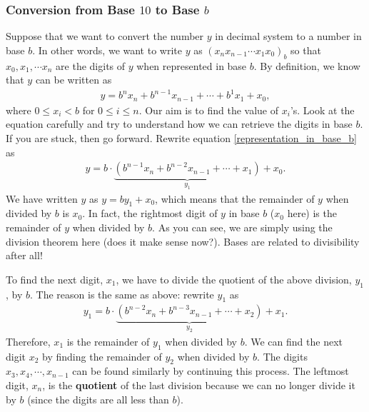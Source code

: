 \documentclass{subfile}
\begin{document}
	\subsubsection{Conversion from Base $10$ to Base $b$}
	Suppose that we want to convert the number $y$ in decimal system to a number in base $b$. In other words, we want to write $y$ as $(x_{n}x_{n-1}\cdots x_1x_0)_b$ so that $x_0, x_1, \cdots x_n$ are the digits of $y$ when represented in base $b$. By definition, we know that $y$ can be written as
	\begin{align}\label{representation_in_base_b}
		y = b^{n} x_{n} + b^{n-1} x_{n-1} + \cdots + b^1x_1 + x_0,
	\end{align}
	where $0 \leq x_i < b$ for $0 \leq i \leq n$. Our aim is to find the value of $x_i$'s. Look at the equation carefully and try to understand how we can retrieve the digits in base $b$. If you are stuck, then go forward. Rewrite equation \eqref{representation_in_base_b} as
	\begin{align*}
		y = b \cdot \underbrace{\left( b^{n-1} x_{n} + b^{n-2} x_{n-1} + \cdots + x_1  \right)}_{y_1} + x_0.
	\end{align*}
	We have written $y$ as $y=by_1 + x_0$, which means that the remainder of $y$ when divided by $b$ is $x_0$. In fact, the rightmost digit of $y$ in base $b$ ($x_0$ here) is the remainder of $y$ when divided by $b$. As you can see, we are simply using the division theorem here (does it make sense now?). Bases are related to divisibility after all!

	To find the next digit, $x_1$, we have to divide the quotient of the above division, $y_1$, by $b$. The reason is the same as above: rewrite $y_1$ as
	\begin{align*}
		y_1 = b \cdot \underbrace{\left( b^{n-2} x_{n} + b^{n-3} x_{n-1} + \cdots + x_2  \right)}_{y_2} + x_1.
	\end{align*}
	Therefore, $x_1$ is the remainder of $y_1$ when divided by $b$. We can find the next digit $x_2$ by finding the remainder of $y_2$ when divided by $b$. The digits $x_3, x_4, \cdots, x_{n-1}$ can be found similarly by continuing this process. The leftmost digit, $x_n$, is the \textbf{quotient} of the last division because we can no longer divide it by $b$ (since the digits are all less than $b$).
\end{document}
